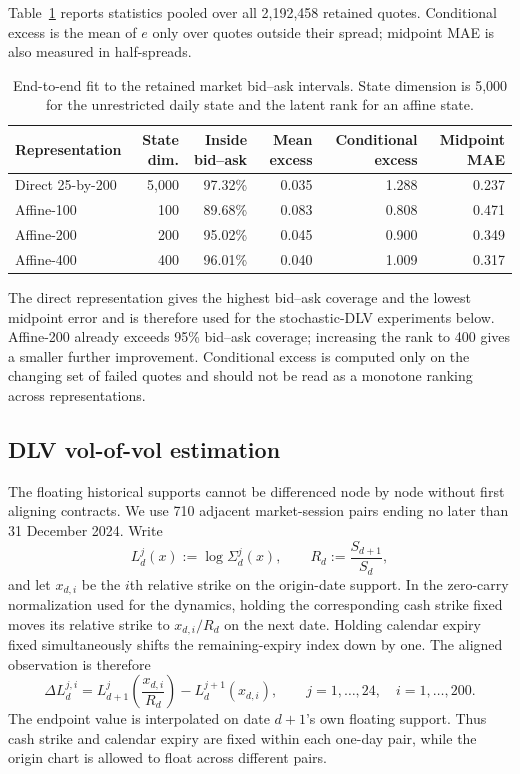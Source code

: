 \documentclass[11pt]{article}
\theoremstyle{plain}
\theoremstyle{definition}
\theoremstyle{remark}
\begin{document}
\label{sec:estimation-results}
Table~\ref{tab:numerics-static-market-fit} reports statistics pooled over all
2,192,458 retained quotes. Conditional excess is the mean of $e$ only over
quotes outside their spread; midpoint MAE is also measured in half-spreads.

\begin{table}[H]
\centering
\small
\begin{tabular}{lrrrrr}
\toprule
Representation & State dim. & Inside bid--ask & Mean excess
  & Conditional excess & Midpoint MAE\\
\midrule
Direct 25-by-200 & 5,000 & 97.32\% & 0.035 & 1.288 & 0.237\\
Affine-100       &   100 & 89.68\% & 0.083 & 0.808 & 0.471\\
Affine-200       &   200 & 95.02\% & 0.045 & 0.900 & 0.349\\
Affine-400       &   400 & 96.01\% & 0.040 & 1.009 & 0.317\\
\bottomrule
\end{tabular}
\caption{End-to-end fit to the retained market bid--ask intervals. State
dimension is 5,000 for the unrestricted daily state and the latent rank for an
affine state.}
\label{tab:numerics-static-market-fit}
\end{table}

The direct representation gives the highest bid--ask coverage and the lowest
midpoint error and is therefore used for the stochastic-DLV experiments below.
Affine-200 already exceeds 95\% bid--ask coverage; increasing the rank to 400
gives a smaller further improvement. Conditional excess is computed only on
the changing set of failed quotes and should not be read as a monotone ranking
across representations.

\subsection{DLV vol-of-vol estimation}
\label{sec:estimation-vol-of-vol}

The floating historical supports cannot be differenced node by node without
first aligning contracts.  We use 710 adjacent market-session pairs ending no
later than 31 December 2024.  Write
\[
  L_d^j(x):=\log\Sigma_d^j(x),
  \qquad R_d:=\frac{S_{d+1}}{S_d},
\]
and let $x_{d,i}$ be the $i$th relative strike on the origin-date support.  In
the zero-carry normalization used for the dynamics, holding the corresponding
cash strike fixed moves its relative strike to $x_{d,i}/R_d$ on the next date.
Holding calendar expiry fixed simultaneously shifts the remaining-expiry index
down by one.  The aligned observation is therefore
\begin{equation}
  \label{eq:estimation-fixed-contract-increment}
  \Delta L_d^{j,i}
  =L_{d+1}^{j}\!\left(\frac{x_{d,i}}{R_d}\right)
   -L_d^{j+1}(x_{d,i}),
  \qquad j=1,\ldots,24,\quad i=1,\ldots,200.
\end{equation}
The endpoint value is interpolated on date $d+1$'s own floating support.  Thus
cash strike and calendar expiry are fixed within each one-day pair, while the
origin chart is allowed to float across different pairs.
\end{document}
